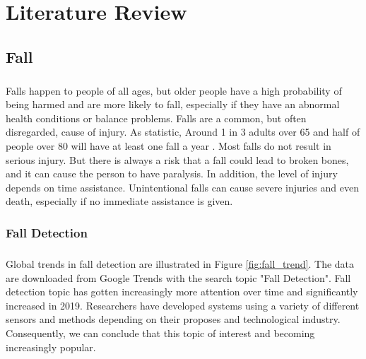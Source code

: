 \setlength{\parindent}{0in} 
\setlength{\parskip}{1em}
\setlength{\baselineskip}{1.6em}


\chapter{Literature Review} 
\label{ch:literature-review}

\section{Fall}
\label{Fall}
\paragraph{}
Falls happen to people of all ages, but older people have a high probability of being  harmed and are more likely to fall, especially if they have an abnormal health conditions or balance problems. Falls are a common, but often disregarded, cause of injury. As statistic, Around 1 in 3 adults over 65 and half of people over 80 will have at least one fall a year \cite{nhs_2019}. Most falls do not result in serious injury. But there is always a risk that a fall could lead to broken bones, and it can cause the person to have paralysis. In addition, the level of injury depends on time assistance. Unintentional falls can cause severe injuries and even death, especially if no immediate assistance is given.

\subsection{Fall Detection}
\paragraph{}
Global trends in fall detection are illustrated in Figure \ref{fig:fall_trend}. The data are downloaded from Google Trends with the search topic "Fall Detection". Fall detection topic has gotten increasingly more attention over time and significantly increased in 2019. Researchers have developed systems using a variety of different sensors and methods depending on their proposes and technological industry. Consequently, we can conclude that this topic of interest and becoming increasingly popular.


